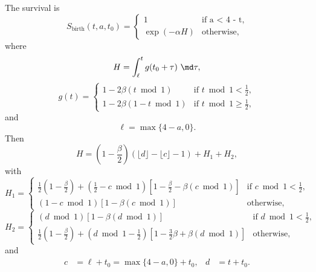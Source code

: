 \documentclass{jpmarticle}
\begin{document}
The survival is
\begin{equation}
  S_{\text{birth}}(t, a, t_0) =
  \begin{cases}
    1 & \text{if a < 4 - t},
    \\
    \exp(-\alpha H) & \text{otherwise},
  \end{cases}
\end{equation}
where
\begin{equation}
  H =
  \int_{\ell}^t g(t_0 + \tau)~\md \tau,
\end{equation}
\begin{equation}
  g (t) =
  \begin{cases}
    1 - 2 \beta (t \bmod 1)
    & \text{if $t \bmod 1 < \frac{1}{2}$},
    \\
    1 - 2 \beta (1 - t \bmod 1)
    & \text{if $t \bmod 1 \geq \frac{1}{2}$},
  \end{cases}
\end{equation}
and
\begin{equation}
  \ell = \max\{4 - a, 0\}.
\end{equation}
Then
\begin{equation}
  H =
  \left(1 - \frac{\beta}{2}\right)
  \left(\lfloor d \rfloor - \lfloor c \rfloor - 1\right)
  + H_1  + H_2,
\end{equation}
with
\begin{equation}
  H_1 =
  \begin{cases}
    \frac{1}{2} \left(1 - \frac{\beta}{2}\right)
    + \left(\frac{1}{2} - c \bmod 1\right)
    \left[1 - \frac{\beta}{2} - \beta \left(c \bmod 1\right)\right]
    & \text{if $c \bmod 1 < \frac{1}{2}$},
    \\
    \left(1 - c \bmod 1\right)
    \left[ 1 - \beta \left(c \bmod 1\right)\right]
    & \text{otherwise},
  \end{cases}
\end{equation}
\begin{equation}
  H_2 =
  \begin{cases}
    \left(d \bmod 1\right)\left[1 - \beta \left(d \bmod 1\right)\right]
    & \text{if $d \bmod 1 < \frac{1}{2}$},
    \\
    \frac{1}{2} \left(1 - \frac{\beta}{2}\right)
    + \left(d \bmod 1 - \frac{1}{2}\right)
    \left[1 - \frac{3}{2} \beta + \beta \left(d \bmod 1\right)\right]
    & \text{otherwise},
    \end{cases}
\end{equation}
and
\begin{align}
  c &= \ell + t_0 = \max\{4 - a, 0\} + t_0,
  &
  d &= t + t_0.
\end{align}
\end{document}
